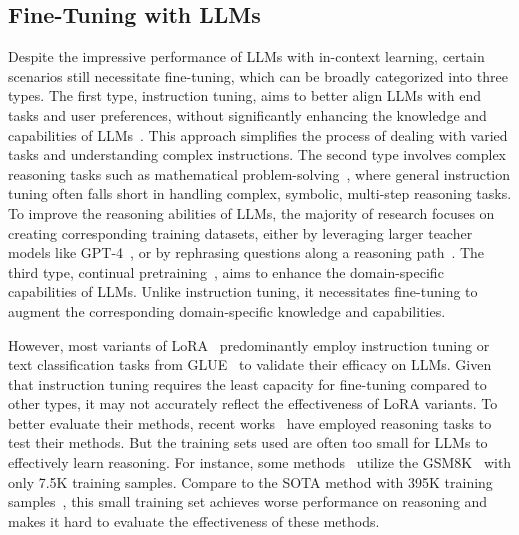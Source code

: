 \documentclass[11pt]{article}
\begin{document}
\subsection{Fine-Tuning with LLMs}
\label{sec:2.2}
Despite the impressive performance of LLMs with in-context learning, certain scenarios still necessitate fine-tuning, which can be broadly categorized into three types.
The first type, instruction tuning, aims to better align LLMs with end tasks and user preferences, without significantly enhancing the knowledge and capabilities of LLMs~\cite{zhou2024lima}. This approach simplifies the process of dealing with varied tasks and understanding complex instructions.
The second type involves complex reasoning tasks such as mathematical problem-solving~\cite{collins2023evaluating, imani2023mathprompter, yu2023metamath}, where general instruction tuning often falls short in handling complex, symbolic, multi-step reasoning tasks. To improve the reasoning abilities of LLMs, the majority of research focuses on creating corresponding training datasets, either by leveraging larger teacher models like GPT-4~\cite{fu2023specializing}, or by rephrasing questions along a reasoning path~\cite{yu2023metamath}.
The third type, continual pretraining~\cite{cheng2023adapting, chen2023disc, han2023medalpaca, liu2023chipnemo}, aims to enhance the domain-specific capabilities of LLMs. Unlike instruction tuning, it necessitates fine-tuning to augment the corresponding domain-specific knowledge and capabilities.

However, most variants of LoRA~\cite{kopiczko2023vera, lialin2023stack, dettmers2024qlora, zhu2024asymmetry} predominantly employ instruction tuning or text classification tasks from GLUE~\cite{wang2018glue} to validate their efficacy on LLMs. Given that instruction tuning requires the least capacity for fine-tuning compared to other types, it may not accurately reflect the effectiveness of LoRA variants.
To better evaluate their methods, recent works~\cite{meng2024periodiclora, liu2024dora, shi2024reslora, renduchintala2023tied} have employed reasoning tasks to test their methods.
But the training sets used are often too small for LLMs to effectively learn reasoning. For instance, some methods~\cite{meng2024periodiclora, renduchintala2023tied} utilize the GSM8K~\cite{cobbe2021training} with only 7.5K training samples. Compare to the SOTA method with 395K training  samples~\cite{yu2023metamath}, this small training set achieves worse performance on reasoning and makes it hard to evaluate the effectiveness of these methods.
\end{document}
